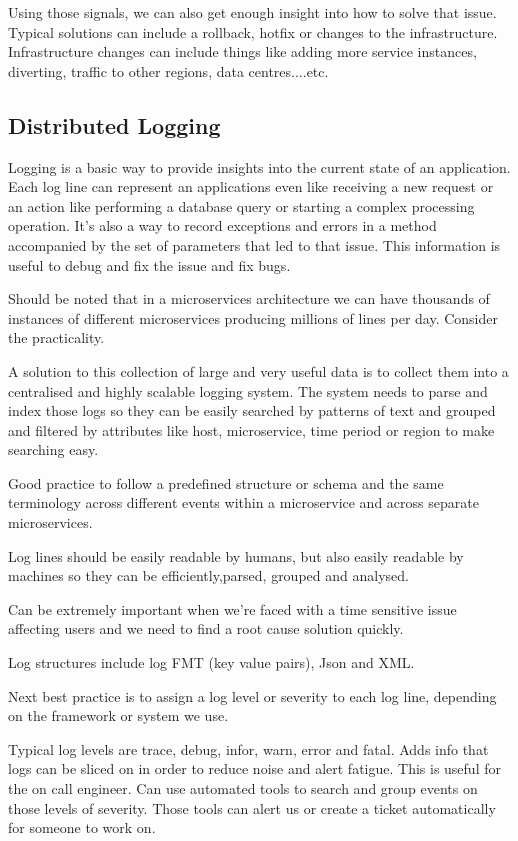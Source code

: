 \documentclass[a4paper, 11pt]{book}
\begin{document}
{    Using those signals, we can also get enough insight into how to solve that issue.
    Typical solutions can include a rollback, hotfix or changes to the infrastructure.
    Infrastructure changes can include things like adding more service instances, diverting, traffic to other regions, data centres....etc.

    \subsection{Distributed Logging}

    Logging is a basic way to provide insights into the current state of an application.
    Each log line can represent an applications even like receiving a new request or an action like performing a database query or starting a complex processing operation.
    It's also a way to record exceptions and errors in a method accompanied by the set of parameters that led to that issue.
    This information is useful to debug and fix the issue and fix bugs.

    Should be noted that in a microservices architecture we can have thousands of instances of different microservices producing millions of lines per day.
    Consider the practicality.

    A solution to this collection of large and very useful data is to collect them into a centralised and highly scalable logging system.
    The system needs to parse and index those logs so they can be easily searched by patterns of text and grouped and filtered by attributes like host, microservice, time period or region to make searching easy.

    Good practice to follow a predefined structure or schema and the same terminology across different events within a microservice and across separate microservices.

    Log lines should be easily readable by humans, but also easily readable by machines so they can be efficiently,parsed, grouped and analysed.

    Can be extremely important when we're faced with a time sensitive issue affecting users and we need to find a root cause solution quickly.

    Log structures include log FMT (key value pairs), Json and XML.

    Next best practice is to assign a log level or severity to each log line, depending on the framework or system we use.

    Typical log levels are trace, debug, infor, warn, error and fatal.
    Adds info that logs can be sliced on in order to reduce noise and alert fatigue.
    This is useful for the on call engineer.
    Can use automated tools to search and group events on those levels of severity.
    Those tools can alert us or create a ticket automatically for someone to work on.

}
\end{document}
